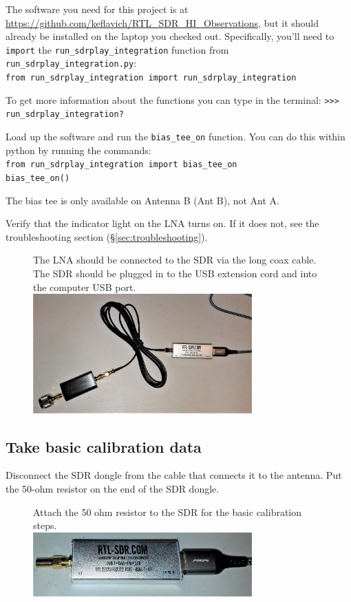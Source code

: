 \documentclass[11pt]{article}
\begin{document}
The software you need for this project is at
\url{https://github.com/keflavich/RTL_SDR_HI_Observations}, but it should
already be installed on the laptop you checked out.  Specifically, you'll need
to \texttt{import} the \texttt{run\_sdrplay\_integration} function from
\texttt{run\_sdrplay\_integration.py}:\\
\verb|from run_sdrplay_integration import run_sdrplay_integration|

To get more information about the functions you can type in the terminal:
   \verb|>>> run_sdrplay_integration?|


Load up the software and run the \texttt{bias\_tee\_on} function.
You can do this within python by running the commands:\\
\verb|from run_sdrplay_integration import bias_tee_on|\\
\verb|bias_tee_on()|

The bias tee is only available on Antenna B (Ant B), not Ant A.


Verify that the indicator light on the LNA turns on.
If it does not, see the troubleshooting section (\S \ref{sec:troubleshooting}).

\begin{figure}[htp]
    \centering
    The LNA should be connected to the SDR via the long coax cable.  The SDR should be plugged in
    to the USB extension cord and into the computer USB port.\\
    \includegraphics[width=0.75\textwidth]{RadioLabPhotos/adapter_to_lna_to_cable_to_sdr.jpg}
\end{figure}

\subsection{Take basic calibration data}
Disconnect the SDR dongle from the cable that connects it to the antenna.
Put the 50-ohm resistor on the end of the SDR dongle.

\begin{figure}[htp]
    \centering
    Attach the 50 ohm resistor to the SDR for the basic calibration steps. \\
\includegraphics[width=0.75\textwidth]{RadioLabPhotos/sdr_with_resistor.jpg}
\end{figure}
\end{document}
